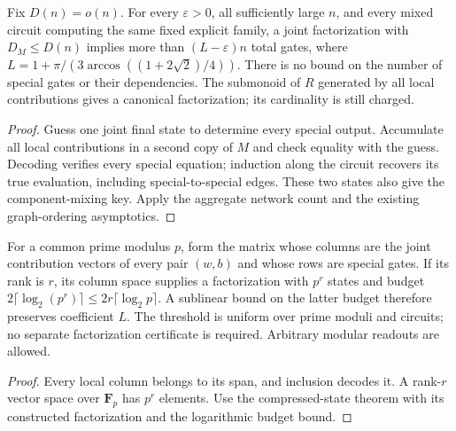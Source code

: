 \begin{theorem}
  \label{thm:lowerbounds-algebraic-aggregate-compressed}
  \leanok
  Fix $D(n)=o(n)$. For every $\varepsilon>0$, all sufficiently large $n$, and
  every mixed circuit computing the same fixed explicit family, a joint
  factorization with $D_M\le D(n)$ implies more than $(L-\varepsilon)n$ total
  gates, where $L=1+\pi/(3\arccos((1+2\sqrt2)/4))$.
  There is no bound on the number of special gates or their dependencies.
  The submonoid of $R$ generated by all local contributions gives a canonical
  factorization; its cardinality is still charged.
\end{theorem}
\begin{proof}
  \leanok
  Guess one joint final state to determine every special output. Accumulate
  all local contributions in a second copy of $M$ and check equality with
  the guess. Decoding verifies every special equation; induction along the
  circuit recovers its true evaluation, including special-to-special edges.
  These two states also give the component-mixing key. Apply the aggregate
  network count and the existing graph-ordering asymptotics.
\end{proof}

\begin{theorem}
  \label{thm:lowerbounds-algebraic-aggregate-modular-rank}
  \leanok
  For a common prime modulus $p$, form the matrix whose columns are the joint
  contribution vectors of every pair $(w,b)$ and whose rows are special gates.
  If its rank is $r$, its column space supplies a factorization with $p^r$
  states and budget $2\lceil\log_2(p^r)\rceil\le2r\lceil\log_2p\rceil$.
  A sublinear bound on the latter budget therefore preserves coefficient $L$.
  The threshold is uniform over prime moduli and circuits; no separate
  factorization certificate is required. Arbitrary modular readouts are allowed.
\end{theorem}
\begin{proof}
  \leanok
  Every local column belongs to its span, and inclusion decodes it. A rank-$r$
  vector space over $\mathbf F_p$ has $p^r$ elements. Use the compressed-state
  theorem with its constructed factorization and the logarithmic budget bound.
\end{proof}

